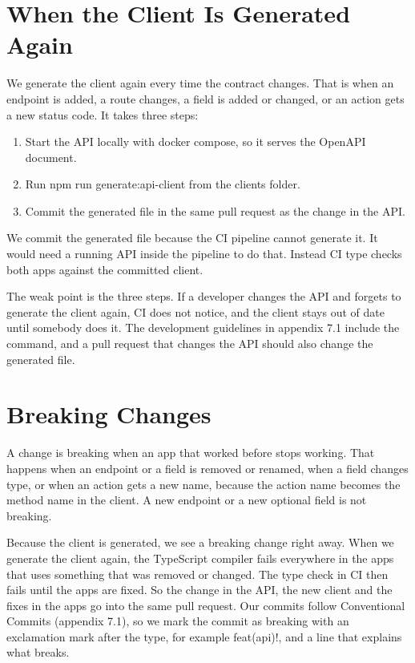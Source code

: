 \documentclass[a4paper,11pt]{article}
\begin{document}
\section{When the Client Is Generated Again}
We generate the client again every time the contract changes. That is when an endpoint is added, a route changes, a field is added or changed, or an action gets a new status code. It takes three steps:
\begin{enumerate}
  \item Start the API locally with docker compose, so it serves the OpenAPI document.
  \item Run npm run generate:api-client from the clients folder.
  \item Commit the generated file in the same pull request as the change in the API.
\end{enumerate}

We commit the generated file because the CI pipeline cannot generate it. It would need a running API inside the pipeline to do that. Instead CI type checks both apps against the committed client.

The weak point is the three steps. If a developer changes the API and forgets to generate the client again, CI does not notice, and the client stays out of date until somebody does it. The development guidelines in appendix 7.1 include the command, and a pull request that changes the API should also change the generated file.

\section{Breaking Changes}
A change is breaking when an app that worked before stops working. That happens when an endpoint or a field is removed or renamed, when a field changes type, or when an action gets a new name, because the action name becomes the method name in the client. A new endpoint or a new optional field is not breaking.

Because the client is generated, we see a breaking change right away. When we generate the client again, the TypeScript compiler fails everywhere in the apps that uses something that was removed or changed. The type check in CI then fails until the apps are fixed. So the change in the API, the new client and the fixes in the apps go into the same pull request. Our commits follow Conventional Commits (appendix 7.1), so we mark the commit as breaking with an exclamation mark after the type, for example feat(api)!, and a line that explains what breaks.
\end{document}
